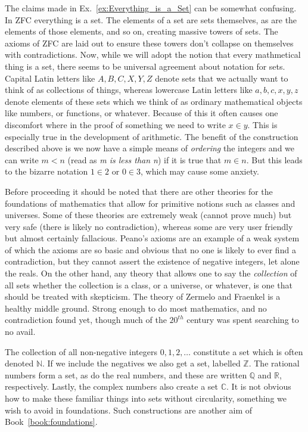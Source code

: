         The claims made in Ex.~\ref{ex:Everything_is_a_Set} can be somewhat
        confusing. In ZFC everything is a set. The elements of a set are sets
        themselves, as are the elements of those elements, and so on,
        creating massive towers of sets. The axioms of ZFC are laid out to
        ensure these towers don't collapse on themselves with contradictions.
        Now, while we will adopt the notion that every mathmetical thing is a
        set, there seems to be universal agreement about notation for sets.
        Capital Latin letters like $A,B,C,X,Y,Z$ denote sets that we actually
        want to think of as collections of things, whereas lowercase Latin
        letters like $a,b,c,x,y,z$ denote elements of these sets which we think
        of as ordinary mathematical objects like numbers, or functions, or
        whatever. Because of this it often causes one discomfort where in the
        proof of something we need to write $x\in{y}$. This is especially true
        in the development of arithmetic. The benefit of the construction
        described above is we now have a simple means of \textit{ordering} the
        integers and we can write $m<n$ (read as \textit{m is less than n}) if
        it is true that $m\in{n}$. But this leads to the bizarre notation
        $1\in{2}$ or $0\in{3}$, which may cause some anxiety.
        \par\hfill\par
        Before proceeding it should be noted that there are other theories for
        the foundations of mathematics that allow for primitive notions such as
        classes and universes. Some of these theories are extremely weak
        (cannot prove much) but very safe (there is likely no contradiction),
        whereas some are very user friendly but almost certainly fallacious.
        Peano's axioms are an example of a weak system of which the axioms are
        so basic and obvious that no one is likely to ever find a
        contradiction, but they cannot assert the existence of negative
        integers, let alone the reals. On the other hand, any theory that
        allows one to say the \textit{collection} of all sets whether the
        collection is a class, or a universe, or whatever, is one that should be
        treated with skepticism. The theory of Zermelo and Fraenkel is a healthy
        middle ground. Strong enough to do most mathematics, and no
        contradiction found yet, though much of the $20^{th}$ century was spent
        searching to no avail.
        \begin{example}
            The collection of all non-negative integers $0,1,2,\dots$ constitute
            a set which is often denoted $\mathbb{N}$. If we include the
            negatives we also get a set, labelled $\mathbb{Z}$. The rational
            numbers form a set, as do the real numbers, and these are written
            $\mathbb{Q}$ and $\mathbb{R}$, respectively. Lastly, the complex
            numbers also create a set $\mathbb{C}$. It is not obvious how to
            make these familiar things into sets without circularity, something
            we wish to avoid in foundations. Such constructions are another aim
            of Book~\ref{book:foundations}.
        \end{example}
